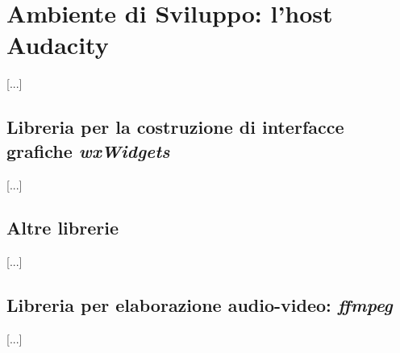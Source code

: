 \chapter{Ambiente di Sviluppo: l'host Audacity}
\label{sec:audacity}
[...]\\



\section{Libreria per la costruzione di interfacce grafiche \emph{wxWidgets}}
\label{sec:GUI}
	
	[...]\\
	
	
\section{Altre librerie}
\label{sec:libs}
	[...]\\
	
	
\section{Libreria per elaborazione audio-video: \emph{ffmpeg}}
\label{sec:}
	[...]\\
